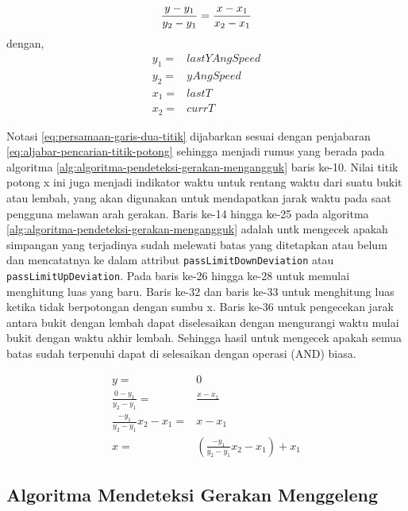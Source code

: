 \begin{equation}
		\frac{y-y_1}{y_2-y_1} = \frac{x-x_1}{x_2-x_1} \\
\label{eq:persamaan-garis-dua-titik}
\end{equation}
dengan,
\[
	\begin{split}
		y_1 = & lastYAngSpeed\\
		y_2 = & yAngSpeed\\
		x_1 = & lastT\\
		x_2 = & currT
	\end{split}
\]

Notasi \ref{eq:persamaan-garis-dua-titik} dijabarkan sesuai dengan penjabaran \ref{eq:aljabar-pencarian-titik-potong} sehingga menjadi rumus yang berada pada algoritma \ref{alg:algoritma-pendeteksi-gerakan-mengangguk} baris ke-10. Nilai titik potong x ini juga menjadi indikator waktu untuk rentang waktu dari suatu bukit atau lembah, yang akan digunakan untuk mendapatkan jarak waktu pada saat pengguna melawan arah gerakan. Baris ke-14 hingga ke-25 pada algoritma \ref{alg:algoritma-pendeteksi-gerakan-mengangguk} adalah untk mengecek apakah simpangan yang terjadinya sudah melewati batas yang ditetapkan atau belum dan mencatatnya ke dalam attribut \texttt{passLimitDownDeviation} atau \texttt{passLimitUpDeviation}. Pada baris ke-26 hingga ke-28 untuk memulai menghitung luas yang baru. Baris ke-32 dan baris ke-33 untuk menghitung luas ketika tidak berpotongan dengan sumbu x. Baris ke-36 untuk pengecekan jarak antara bukit dengan lembah dapat diselesaikan dengan mengurangi waktu mulai bukit dengan waktu akhir lembah. Sehingga hasil untuk mengecek apakah semua batas sudah terpenuhi dapat di selesaikan dengan operasi (AND) biasa. 

\begin{equation}
	\begin{split}
		y = & 0\\		
		\frac{0-y_1}{y_2-y_1} = & \frac{x-x_1}{} \\
		\frac{-y_1}{y_2-y_1} x_2-x_1 = & x-x_1 \\
		x = & (\frac{-y_1}{y_2-y_1} x_2-x_1) +x_1
	\end{split}
\label{eq:aljabar-pencarian-titik-potong}
\end{equation}


\subsection{Algoritma Mendeteksi Gerakan Menggeleng}
\label{ssec:algoritme_mendeteksi_gerakan_menggeleng}

